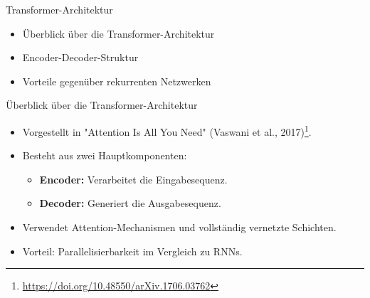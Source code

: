 \documentclass[aspectratio=1610, xcolor=dvipsnames, 9pt]{beamer}
\begin{document}
\begin{frame}{Transformer-Architektur}
  \begin{itemize}
    \item Überblick über die Transformer-Architektur \\
    \item Encoder-Decoder-Struktur \\
    \item Vorteile gegenüber rekurrenten Netzwerken
  \end{itemize}
\end{frame}

\begin{frame}{Überblick über die Transformer-Architektur}
  \begin{itemize}
    \item Vorgestellt in "Attention Is All You Need" (Vaswani et al., 2017)\footnote{\url{https://doi.org/10.48550/arXiv.1706.03762}}.
    \item Besteht aus zwei Hauptkomponenten:
      \begin{itemize}
        \item \textbf{Encoder:} Verarbeitet die Eingabesequenz.
        \item \textbf{Decoder:} Generiert die Ausgabesequenz.
      \end{itemize}
    \item Verwendet Attention-Mechanismen und vollständig vernetzte Schichten.
    \item Vorteil: Parallelisierbarkeit im Vergleich zu RNNs.
  \end{itemize}
\end{frame}
\end{document}
